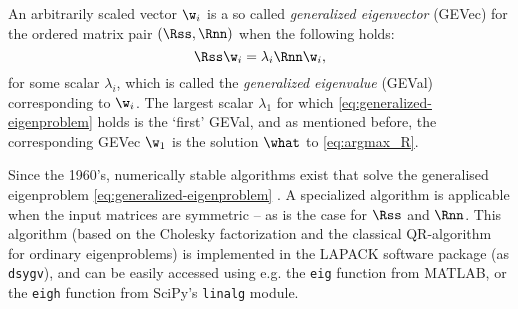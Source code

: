 An arbitrarily scaled vector $\w_i$ is a so called \emph{generalized eigenvector} (GEVec) for the ordered matrix pair $(\Rss, \Rnn)$ when the following holds:
%
\begin{equation}
\label{eq:generalized-eigenproblem}
\Rss \w_i = \lambda_i \Rnn \w_i,
\end{equation}
%
for some scalar $\lambda_i$, which is called the \emph{generalized eigenvalue} (GEVal) corresponding to $\w_i$. The largest scalar $\lambda_1$ for which \cref{eq:generalized-eigenproblem} holds is the `first' GEVal, and as mentioned before, the corresponding GEVec $\w_1$ is the solution $\what$ to \cref{eq:argmax_R}.

Since the 1960's, numerically stable algorithms exist that solve the generalised eigenproblem \cref{eq:generalized-eigenproblem} \cite{Golub2013}. A specialized algorithm is applicable when the input matrices are symmetric -- as is the case for $\Rss$ and $\Rnn$. This algorithm (based on the Cholesky factorization and the classical QR-algorithm for ordinary eigenproblems) is implemented in the LAPACK software package (as \texttt{dsygv}), and can be easily accessed using e.g. the \texttt{eig} function from MATLAB, or the \texttt{eigh} function from SciPy's \texttt{linalg} module.


\begin{figure}
\end{figure}
